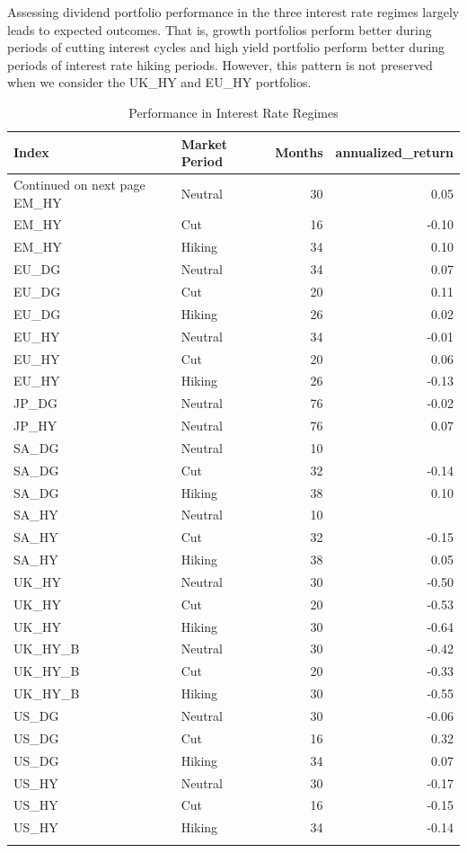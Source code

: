 \documentclass[12pt,preprint, authoryear]{elsarticle}
\numberwithin{equation}{section}
\numberwithin{figure}{section}
\numberwithin{table}{section}
\begin{document}
Assessing dividend portfolio performance in the three interest rate
regimes largely leads to expected outcomes. That is, growth portfolios
perform better during periods of cutting interest cycles and high yield
portfolio perform better during periods of interest rate hiking periods.
However, this pattern is not preserved when we consider the UK\_HY and
EU\_HY portfolios.

\begingroup\fontsize{12pt}{13pt}\selectfont
\begin{longtable}{llrr}
  \toprule
Index & Market Period & Months & annualized\_return \\ 
  \hline 
\endhead 
\hline 
{\footnotesize Continued on next page} 
\endfoot 
\endlastfoot 
 \midrule
EM\_HY & Neutral &  30 & 0.05 \\ 
  EM\_HY & Cut &  16 & -0.10 \\ 
  EM\_HY & Hiking &  34 & 0.10 \\ 
  EU\_DG & Neutral &  34 & 0.07 \\ 
  EU\_DG & Cut &  20 & 0.11 \\ 
  EU\_DG & Hiking &  26 & 0.02 \\ 
  EU\_HY & Neutral &  34 & -0.01 \\ 
  EU\_HY & Cut &  20 & 0.06 \\ 
  EU\_HY & Hiking &  26 & -0.13 \\ 
  JP\_DG & Neutral &  76 & -0.02 \\ 
  JP\_HY & Neutral &  76 & 0.07 \\ 
  SA\_DG & Neutral &  10 &  \\ 
  SA\_DG & Cut &  32 & -0.14 \\ 
  SA\_DG & Hiking &  38 & 0.10 \\ 
  SA\_HY & Neutral &  10 &  \\ 
  SA\_HY & Cut &  32 & -0.15 \\ 
  SA\_HY & Hiking &  38 & 0.05 \\ 
  UK\_HY & Neutral &  30 & -0.50 \\ 
  UK\_HY & Cut &  20 & -0.53 \\ 
  UK\_HY & Hiking &  30 & -0.64 \\ 
  UK\_HY\_B & Neutral &  30 & -0.42 \\ 
  UK\_HY\_B & Cut &  20 & -0.33 \\ 
  UK\_HY\_B & Hiking &  30 & -0.55 \\ 
  US\_DG & Neutral &  30 & -0.06 \\ 
  US\_DG & Cut &  16 & 0.32 \\ 
  US\_DG & Hiking &  34 & 0.07 \\ 
  US\_HY & Neutral &  30 & -0.17 \\ 
  US\_HY & Cut &  16 & -0.15 \\ 
  US\_HY & Hiking &  34 & -0.14 \\ 
   \bottomrule
\caption{Performance in Interest Rate Regimes\label{tab3}} 
\end{longtable}
\endgroup
\end{document}
